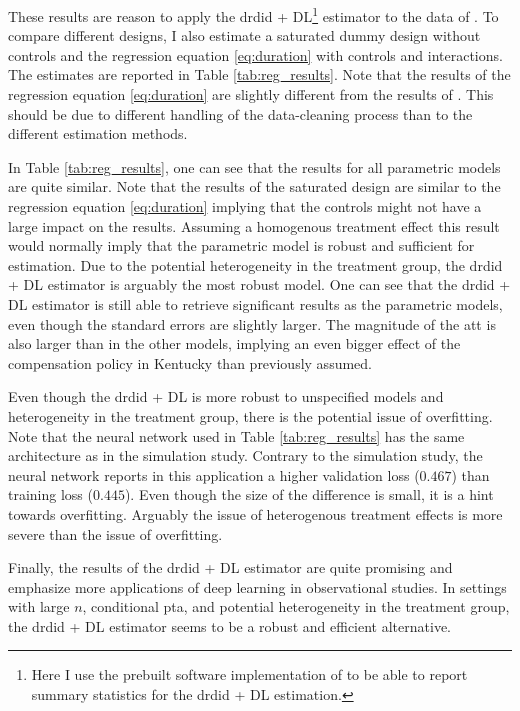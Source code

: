 These results are reason to apply the \ac{drdid} + DL\footnote[5]{Here I use the prebuilt software implementation of \citet*{doubleml2024R} to be able to report summary statistics for the \ac{drdid} + DL estimation.} estimator to the data of \citet{meyer1990workers}.
To compare different designs, I also estimate a saturated dummy design without controls and the regression equation \ref{eq:duration} with controls and interactions.
The estimates are reported in Table \ref{tab:reg_results}.
Note that the results of the regression equation \ref{eq:duration} are slightly different from the results of \citet{meyer1990workers}.
This should be due to different handling of the data-cleaning process than to the different estimation methods.



In Table \ref{tab:reg_results}, one can see that the results for all parametric models are quite similar.
Note that the results of the saturated design are similar to the regression equation \ref{eq:duration} implying that the controls might not have a large impact on the results.
Assuming a homogenous treatment effect this result would normally imply that the parametric model is robust and sufficient for estimation.
Due to the potential heterogeneity in the treatment group, the \ac{drdid} + DL estimator is arguably the most robust model.
One can see that the \ac{drdid} + DL estimator is still able to retrieve significant results as the parametric models, even though the standard errors are slightly larger.
The magnitude of the \ac{att} is also larger than in the other models, implying an even bigger effect of the compensation policy in Kentucky than previously assumed.

Even though the \ac{drdid} + DL is more robust to unspecified models and heterogeneity in the treatment group, there is the potential issue of overfitting.
Note that the neural network used in Table \ref{tab:reg_results} has the same architecture as in the simulation study.
Contrary to the simulation study, the neural network reports in this application a higher validation loss ($0.467$) than training loss ($0.445$).
Even though the size of the difference is small, it is a hint towards overfitting.
Arguably the issue of heterogenous treatment effects is more severe than the issue of overfitting.

Finally, the results of the \ac{drdid} + DL estimator are quite promising and emphasize more applications of deep learning in observational studies.
In settings with large $n$, conditional \ac{pta}, and potential heterogeneity in the treatment group, the \ac{drdid} + DL estimator seems to be a robust and efficient alternative.
